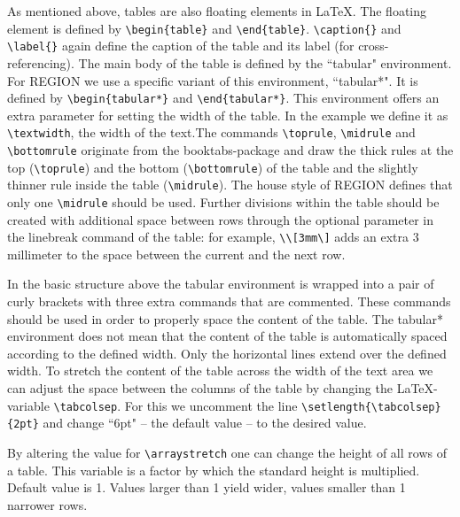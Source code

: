 \documentclass[a4paper,twoside]{article}
\begin{document}
As mentioned above, tables are also floating elements in \LaTeX. The floating element is defined by \verb|\begin{table}| and \verb|\end{table}|. \verb|\caption{}| and \verb|\label{}| again define the caption of the table and its label (for cross-referencing). The main body of the table is defined by the ``tabular" environment. For REGION we use a specific variant of this environment, ``tabular*". It is defined by \verb|\begin{tabular*}| and \verb|\end{tabular*}|. This environment offers an extra parameter for setting the width of the table. In the example we define it as \verb|\textwidth|, the width of the text.The commands \verb|\toprule|, \verb|\midrule| and \verb|\bottomrule| originate from the booktabs-package and draw the thick rules at the top (\verb|\toprule|) and the bottom (\verb|\bottomrule|) of the table and the slightly thinner rule inside the table (\verb|\midrule|). The house style of REGION defines that only one \verb|\midrule| should be used. Further divisions within the table should be created with additional space between rows through the optional parameter in the linebreak command of the table: for example, \verb|\\[3mm\]| adds an extra 3 millimeter to the space between the current and the next row.

In the basic structure above the tabular environment is wrapped into a pair of curly brackets with three extra commands that are commented. These commands should be used in order to properly space the content of the table. The tabular* environment does not mean that the content of the table is automatically spaced according to the defined width. Only the horizontal lines extend over the defined width. To stretch the content of the table across the width of the text area we can adjust the space between the columns of the table by changing the \LaTeX-variable \verb|\tabcolsep|. For this we uncomment the line \verb|\setlength{\tabcolsep}{2pt}| and change ``6pt" -- the default value -- to the desired value.

By altering the value for \verb|\arraystretch| one can change the height of all rows of a table. This variable is a factor by which the standard height is multiplied. Default value is 1. Values larger than 1 yield wider, values smaller than 1 narrower rows.
\end{document}
